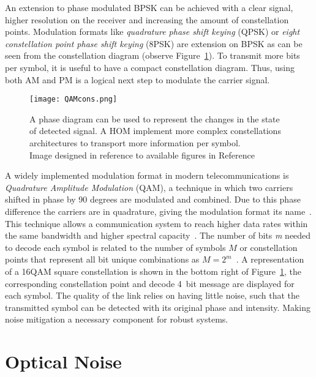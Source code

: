   An extension to phase modulated BPSK can be achieved with a clear signal, higher resolution on the receiver and increasing the amount of constellation points. Modulation formats like \textit{quadrature phase shift keying} (QPSK) or \textit{eight constellation point phase shift keying} (8PSK) are extension on BPSK as can be seen from the constellation diagram (observe Figure~\ref{fig:QAMcons}). To transmit more bits per symbol, it is useful to have a compact constellation diagram. Thus, using both AM and PM is a logical next step to modulate the carrier signal.
 
 \begin{figure}[h]
\centering
\texttt{[image: QAMcons.png]}
\caption{A phase diagram can be used to represent the changes in the state of detected signal. A HOM  implement more complex constellations architectures to transport more information per symbol.\\ {\scriptsize Image designed in reference to available figures in Reference~\cite{khan2019optical}}     }
\label{fig:QAMcons}
\end{figure}

A widely implemented modulation format in modern telecommunications is \textit{Quadrature Amplitude Modulation} (QAM), a technique in which two carriers shifted in phase by 90 degrees are modulated and combined. Due to this phase difference the carriers are in quadrature, giving the modulation format its name~\cite{benedetto1999principles}. This technique allows a communication system to reach higher data rates within the same bandwidth and higher spectral capacity~\cite{webb1994modern}. The number of bits \emph{m} needed to decode each symbol  is related to the number of symbols $M$ or constellation points that represent all bit unique combinations as $M=2^{m}$~\cite{paik1994mode}.  A representation of a 16QAM square constellation is shown in the bottom right of Figure~\ref{fig:QAMcons}, the corresponding constellation point and decode 4~bit message are displayed for each symbol. The quality of the link relies on having little noise, such that the transmitted symbol can be detected with its original phase and intensity. Making noise mitigation a necessary component for robust systems. 
 
 
  
 \section{Optical Noise}
  
